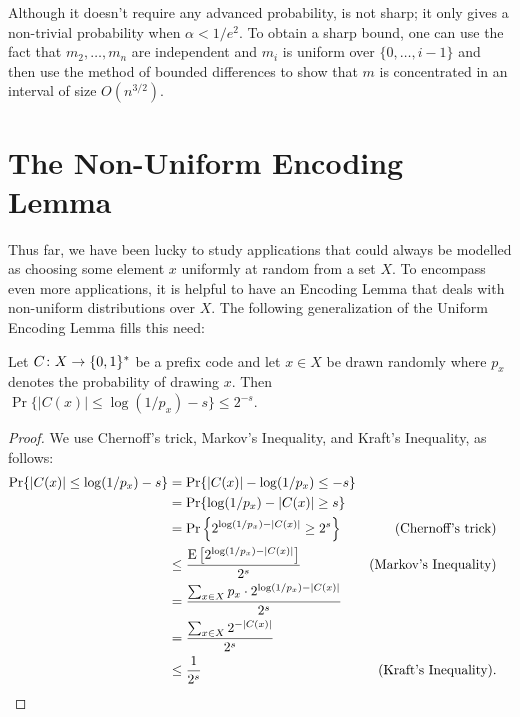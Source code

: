 \documentclass[lotsofwhite]{patmorin}
\begin{document}
\begin{rem}
  Although it doesn't require any advanced probability,
   is not sharp; it only gives a non-trivial
  probability when $\alpha < 1/e^2$.  To obtain a sharp bound, one can
  use the fact that $m_2,\ldots,m_n$ are independent and $m_i$ is uniform
  over $\{0,\ldots,i-1\}$ and then use the method of bounded differences
  \cite{mcdiarmid:on} to show that $m$ is concentrated in an interval
  of size $O(n^{3/2})$.
\end{rem}




\section{The Non-Uniform Encoding Lemma}

Thus far, we have been lucky to study applications that could always
be modelled as choosing some element $x$ uniformly at random from a
set $X$. To encompass even more applications, it is helpful to have
an Encoding Lemma that deals with non-uniform distributions over $X$.
The following generalization of the Uniform Encoding Lemma fills this
need:

\begin{lem}  
  Let $C\colon X\to\{0,1\}^*$ be a prefix code and let $x\in X$ be
  drawn randomly where $p_x$ denotes the probability of drawing $x$.
  Then $\Pr\{ |C(x)| \le \log(1/p_x)-s\} \le 2^{-s}$.
\end{lem}

\begin{proof}
  We use Chernoff's trick, Markov's Inequality, and Kraft's Inequality,
  as follows: 
  \begin{align*}
     \Pr\{ |C(x)| \le\log(1/p_x)-s \} 
      & = \Pr\{|C(x)| -\log(1/p_x) \le -s \} \\
      & = \Pr\{\log(1/p_x)-|C(x)| \ge s \} \\
      & = \Pr\left\{2^{\log(1/p_x)-|C(x)|} \ge 2^s \right\} & \text{(Chernoff's trick)} \\
      & \le \frac{\mathrm{E}\left[2^{\log(1/p_x)-|C(x)|}\right]}{2^s} & \text{(Markov's Inequality)} \\
      & = \frac{\sum_{x\in X}p_x\cdot 2^{\log(1/p_x)-|C(x)|}}{2^s} \\
      & = \frac{\sum_{x\in X}2^{-|C(x)|}}{2^s} \\
      & \le \frac{1}{2^s} & \text{(Kraft's Inequality).}  & \qedhere
  \end{align*}
\end{proof}
\end{document}
